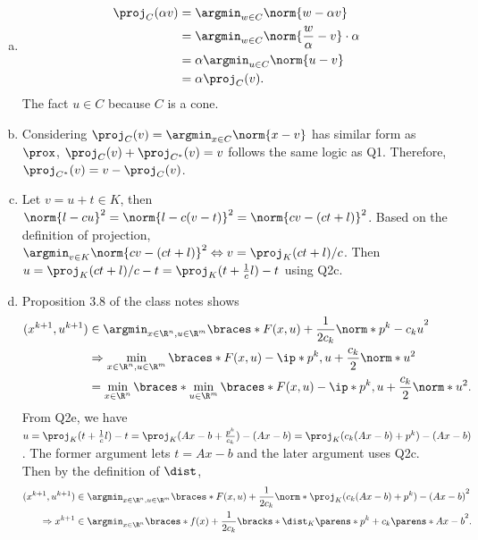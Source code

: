 \documentclass{article}
\theoremstyle{plain}
\theoremstyle{definition}
\theoremstyle{remark}
\begin{document}
\begin{solution}
\begin{enumerate}[(a)]
{\begin{proof}
                The two directions are proved.
            \end{proof}
        }
        \item {
            \begin{align*}
                \proj_C(\alpha v)
                &= \argmin_{w\in C}\norm{w-\alpha v} \\
                &= \argmin_{w\in C}\norm{\frac{w}{\alpha}-v}\cdot \alpha \\
                &= \alpha \argmin_{u\in C}\norm{u-v} \\
                &= \alpha \proj_C(v).
            \end{align*}
            The fact $u\in C$ because $C$ is a cone.
        }
        \item {
            Considering $\proj_C(v)=\argmin_{x\in C}\norm{x-v}$ has similar form as $\prox$, $\proj_C(v)+\proj_{C^*}(v)=v$ follows the same logic as Q1. Therefore, $\proj_{C^*}(v)=v-\proj_C(v)$.
        }
        \item {
            Let $v=u+t\in K$, then $\norm{l-cu}^2=\norm{l-c(v-t)}^2=\norm{cv-(ct+l)}^2$. Based on the definition of projection, $\argmin_{v\in K}\norm{cv-(ct+l)}^2 \Leftrightarrow v=\proj_{K}(ct+l)/c$. Then $u=\proj_{K}(ct+l)/c-t=\proj_{K}(t+\frac{1}{c}l)-t$ using Q2c.
        }
        \item {
            Proposition 3.8 of the class notes shows
            \begin{align*}
                (x^{k+1}, u^{k+1})
                &\in\argmin_{x\in\R^n, u\in\R^m}\braces*{F(x, u)+\frac{1}{2c_k}\norm*{p^k-c_ku}^2} \\
                &\Rightarrow \min_{x\in\R^n, u\in\R^m}\braces*{F(x,u)-\ip*{p^k, u}+\frac{c_k}{2}\norm*{u}^2} \\
                &= \min_{x\in\R^n}\braces*{\min_{u\in\R^m}\braces*{F(x,u)-\ip*{p^k, u}+\frac{c_k}{2}\norm*{u}^2}}.
            \end{align*}
            From Q2e, we have $u=\proj_{K}(t+\frac{1}{c}l)-t=\proj_{K}(Ax-b+\frac{p^k}{c_k})-(Ax-b)=\proj_{K}(c_k(Ax-b)+p^k)-(Ax-b)$. The former argument lets $t=Ax-b$ and the later argument uses Q2c. Then by the definition of $\dist$,
            \begin{align*}
                (x^{k+1}, u^{k+1})
                &\in\argmin_{x\in\R^n, u\in\R^m}\braces*{F(x, u)+\frac{1}{2c_k}\norm*{\proj_{K}(c_k(Ax-b)+p^k)-(Ax-b)}^2} \\
                \Rightarrow x^{k+1} & \in \argmin_{x\in\R^n} \braces*{f(x) + \frac{1}{2c_k}\bracks*{\dist_K\parens*{p^k+c_k\parens*{Ax-b}}}^2}.

\end{align*}}
\end{enumerate}
\end{solution}
\end{document}
